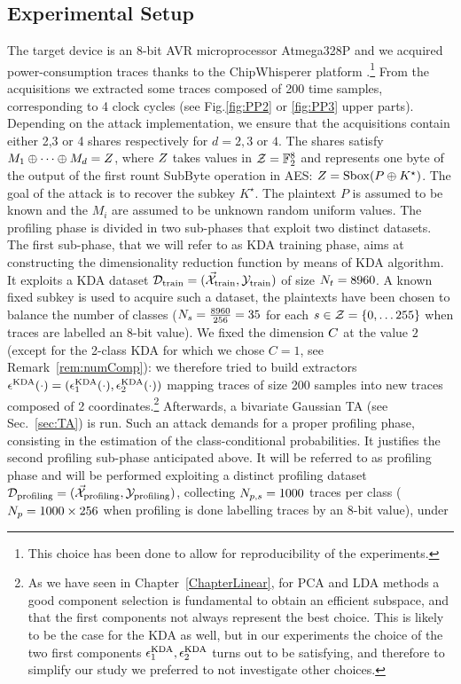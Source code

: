\subsection{Experimental Setup}\label{sec:experimental_setup}
The target device is an 8-bit AVR microprocessor Atmega328P and we acquired power-consumption traces thanks to the ChipWhisperer platform \cite{o2014chipwhisperer}.\footnote{This choice has been done to allow for reproducibility of the experiments.} From the acquisitions we extracted some traces composed of 200 time samples, corresponding to 4 clock cycles (see Fig.\ref{fig:PP2} or \ref{fig:PP3} upper parts). Depending on the attack implementation, we ensure that the acquisitions contain either 2,3 or 4 shares respectively for $d=2,3$ or $4$. The shares satisfy $M_1 \oplus \dots \oplus M_d = Z$,
where $Z$ takes values in $\mathcal{Z} = \mathbb{F}_2^8$ and represents one byte of the output of the first rount SubByte operation in AES: $Z = \mathrm{Sbox}(P\oplus K^\star)$. The goal of the attack is to recover the subkey $K^\star$. The plaintext $P$ is assumed to be known and the $M_i$ are assumed to be unknown random uniform values. The profiling phase is divided in two sub-phases that exploit two distinct datasets. The first sub-phase, that we will refer to as KDA training phase, aims at constructing the dimensionality reduction function by means of KDA algorithm. It exploits a KDA dataset $\mathcal{D}_{\text{train}} = (\vec{\mathcal{X}}_{\text{train}},\mathcal{Y}_{\text{train}})$ of size $N_t=8960$.  A known fixed subkey is used to acquire such a dataset, the plaintexts have been chosen to balance the number of classes (\eg $N_{s}=\frac{8960}{256}=35$  for each $s\in \mathcal{Z}=\{0,\dots 255\}$ when traces are labelled \via an 8-bit value).  We fixed the dimension $C$  at the value $2$ (except for the 2-class KDA for which we chose $C=1$, see Remark~\ref{rem:numComp}): we therefore tried to build extractors $\epsilon^{\mathrm{KDA}}(\cdot) = (\epsilon^{\mathrm{KDA}}_1(\cdot), \epsilon^{\mathrm{KDA}}_2(\cdot))$ mapping traces of size 200 samples into new traces composed of 2 coordinates.\footnote{As we have seen in Chapter~\ref{ChapterLinear}, for PCA and LDA methods a good component selection is fundamental to obtain an efficient subspace, and that the first components not always represent the best choice. This is likely to be the case for the KDA as well, but in our experiments the choice of the two first components $\epsilon^{\mathrm{KDA}}_1, \epsilon^{\mathrm{KDA}}_2$ turns out to be satisfying, and therefore to simplify our study we preferred to not investigate other choices.} Afterwards, a bivariate Gaussian TA (see Sec.~\ref{sec:TA}) is run. Such an attack demands for a proper profiling phase, consisting in the estimation of the  class-conditional probabilities. It justifies the second profiling sub-phase anticipated above. It will be referred to as profiling phase and will be performed exploiting a distinct profiling dataset  $\mathcal{D}_{\text{profiling}} = (\vec{\mathcal{X}}_{\text{profiling}},\mathcal{Y}_{\text{profiling}})$, collecting $N_{p,s} = 1000$ traces per class (\eg $N_p = 1000\times 256$ when profiling is done labelling traces by an 8-bit value), under 